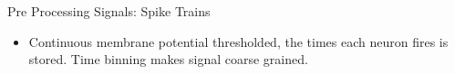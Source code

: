 \documentclass{beamer}
\begin{document}
\begin{frame}{Pre Processing Signals: Spike Trains}
\begin{itemize}


\vfill \item Continuous membrane potential thresholded, the times each neuron fires is stored. Time binning makes signal coarse grained. %
\end{itemize}


\end{frame}
\end{document}
